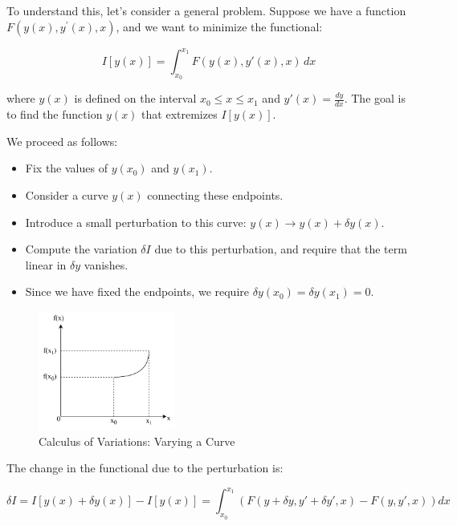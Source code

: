 To understand this, let's consider a general problem. Suppose we have a function 
$F(y(x), y^\prime(x), x)$, and we want to minimize the functional:

\begin{equation}
    I[y(x)]=\int_{x_{0}}^{x_{1}} F(y(x), y'(x), x) \, dx
\end{equation}

where $y(x)$ is defined on the interval $x_0 \leq x \leq x_1$ and $y'(x) = \frac{dy}{dx}$. 
The goal is to find the function $y(x)$ that extremizes $I[y(x)]$.

We proceed as follows:

\begin{itemize}
    \item Fix the values of $y(x_0)$ and $y(x_1)$.
    \item Consider a curve $y(x)$ connecting these endpoints.
    \item Introduce a small perturbation to this curve: $y(x) \rightarrow y(x) + \delta y(x)$.
    \item Compute the variation $\delta I$ due to this perturbation, and require that the term linear in $\delta y$ vanishes.
    \item Since we have fixed the endpoints, we require $\delta y(x_0) = \delta y(x_1) = 0$.
\end{itemize}

\begin{figure}[ht]
    \centering
    \includegraphics[width=0.4\textwidth]{images/3-1-1.png}
    \caption{Calculus of Variations: Varying a Curve}
    \label{fig:3-1-1}
\end{figure}

The change in the functional due to the perturbation is:

\begin{equation}
    \delta I = I[y(x) + \delta y(x)] - I[y(x)] = \int_{x_0}^{x_1} \left( F(y + \delta y, y' + \delta y', x) - F(y, y', x) \right) dx
    \label{eq:delta_I_definition}
\end{equation}


